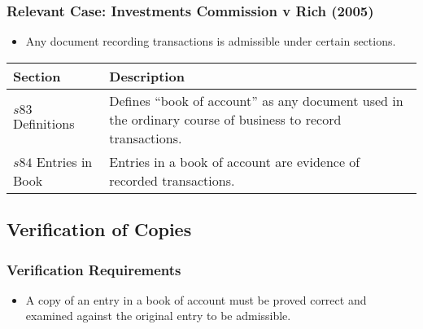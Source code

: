 \subsubsection{Relevant Case: Investments Commission v Rich
(2005)}\label{relevant-case-investments-commission-v-rich-2005}

\begin{itemize}
\tightlist
\item
  Any document recording transactions is admissible under certain
  sections.
\end{itemize}

\begin{longtable}[]{@{}
  >{\raggedright\arraybackslash}p{}
  >{\raggedright\arraybackslash}p{}@{}}
\toprule\noalign{}
\begin{minipage}[b]{\linewidth}\raggedright
Section
\end{minipage} & \begin{minipage}[b]{\linewidth}\raggedright
Description
\end{minipage} \\
\midrule\noalign{}
\endhead
\bottomrule\noalign{}
\endlastfoot
\(s83\) Definitions & Defines ``book of account'' as any document used
in the ordinary course of business to record transactions. \\
\(s84\) Entries in Book & Entries in a book of account are evidence of
recorded transactions. \\
\end{longtable}

\subsection{ Verification of Copies}\label{verification-of-copies}

\subsubsection{Verification
Requirements}\label{verification-requirements}

\begin{itemize}
\tightlist
\item
  A copy of an entry in a book of account must be proved correct and
  examined against the original entry to be admissible.
\end{itemize}

